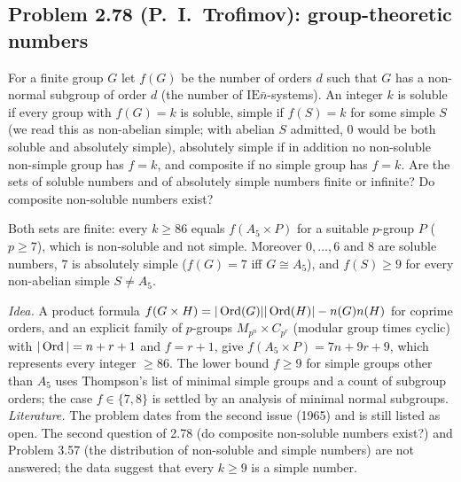 \subsection{Problem 2.78 (P.~I.~Trofimov): group-theoretic numbers}
\begin{problem}[2.78]
For a finite group $G$ let $f(G)$ be the number of orders $d$ such that $G$ has a non-normal subgroup of order $d$
(the number of $\mathrm{IE}\bar n$-systems). An integer $k$ is soluble if every group with $f(G)=k$ is soluble,
simple if $f(S)=k$ for some simple $S$ (we read this as non-abelian simple; with abelian $S$ admitted, $0$ would
be both soluble and absolutely simple), absolutely simple if in addition no non-soluble non-simple
group has $f=k$, and composite if no simple group has $f=k$. Are the sets of soluble numbers and of absolutely
simple numbers finite or infinite? Do composite non-soluble numbers exist?
\end{problem}
\begin{theorem}\label{thm:278}
Both sets are finite: every $k\ge 86$ equals $f(A_5\times P)$ for a suitable $p$-group $P$ ($p\ge 7$), which is
non-soluble and not simple. Moreover $0,\dots,6$ and $8$ are soluble numbers, $7$ is absolutely simple
($f(G)=7$ iff $G\cong A_5$), and $f(S)\ge 9$ for every non-abelian simple $S\ne A_5$.
\end{theorem}
\emph{Idea.} A product formula $f(G\times H)=|\operatorname{Ord}(G)||\operatorname{Ord}(H)|-n(G)n(H)$ for coprime orders, and an explicit family
of $p$-groups $M_{p^n}\times C_{p^r}$ (modular group times cyclic) with $|\operatorname{Ord}|=n+r+1$ and $f=r+1$, give
$f(A_5\times P)=7n+9r+9$, which represents every integer $\ge 86$. The lower bound $f\ge 9$ for simple groups
other than $A_5$ uses Thompson's list of minimal simple groups and a count of subgroup orders; the case $f\in\{7,8\}$
is settled by an analysis of minimal normal subgroups. \emph{Literature.} The problem dates from the second issue
(1965) and is still listed as open. The second question of 2.78 (do composite non-soluble numbers exist?) and
Problem 3.57 (the distribution of non-soluble and simple numbers) are not answered; the data suggest that every
$k\ge 9$ is a simple number.

